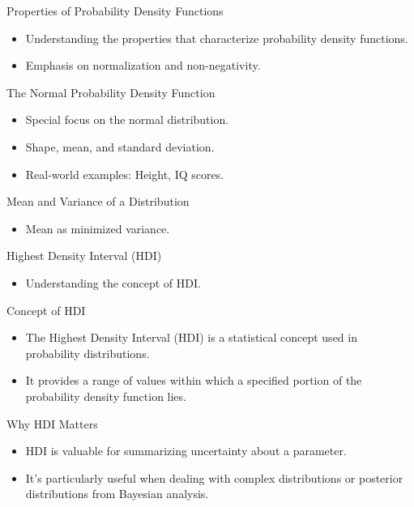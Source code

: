 \documentclass{beamer}
\begin{document}
\begin{frame}{Properties of Probability Density Functions}
  \begin{itemize}
    \item Understanding the properties that characterize probability density functions.
    \item Emphasis on normalization and non-negativity.
  \end{itemize}
\end{frame}

\begin{frame}{The Normal Probability Density Function}
  \begin{itemize}
    \item Special focus on the normal distribution.
    \item Shape, mean, and standard deviation.
    \item Real-world examples: Height, IQ scores.
  \end{itemize}
\end{frame}



\begin{frame}{Mean and Variance of a Distribution}
  \begin{itemize}
    \item Mean as minimized variance.
  \end{itemize}
\end{frame}

\begin{frame}{Highest Density Interval (HDI)}
  \begin{itemize}
    \item Understanding the concept of HDI.
  \end{itemize}
\end{frame}

\begin{frame}{Concept of HDI}
  \begin{itemize}
    \item The Highest Density Interval (HDI) is a statistical concept used in probability distributions.
    \item It provides a range of values within which a specified portion of the probability density function lies.
  \end{itemize}
\end{frame}

\begin{frame}{Why HDI Matters}
  \begin{itemize}
    \item HDI is valuable for summarizing uncertainty about a parameter.
    \item It's particularly useful when dealing with complex distributions or posterior distributions from Bayesian analysis.
  \end{itemize}
\end{frame}
\end{document}
